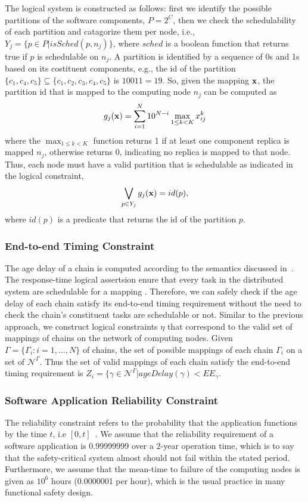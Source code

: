 The logical system is constructed as follows: first we identify the possible partitions of the software components, $P=2^C$, then we check the schedulability of each partition and catagorize them per node, i.e., $Y_j=\{p\in P| isSched(p,n_j)\}$, where $sched$ is a boolean function that returns true if $p$ is schedulable on $n_j$.  A partition is identified by a sequence of 0s and 1s based on its costituent components, e.g., the id of the partition $\{c_1,c_4,c_5\}\subseteq \{c_1,c_2,c_3,c_4,c_5\}$ is $10011=19$. So, given the mapping $\textbf{x}$, the partition id that is mapped to the computing node $n_j$ can be computed as
\begin{align}
	g_j(\textbf{x})=\sum_{i=1}^{N}{10^{N-i}\max_{1\leq k< K}x^{k}_{ij}}
\end{align}
where the $\max_{1\leq k< K}$ function returns 1 if at least one component replica is mapped $n_j$, otherwise returns 0, indicating no replica is mapped to that node. Thus, each node must have a valid partition that is schedulable as indicated in the logical constraint,
\begin{align}
\bigvee\limits_{p\in Y_j}g_j (\textbf{x})= id(p) ,
\end{align}
where $id(p)$ is a predicate that returns the id of the partition $p$.

\subsubsection{End-to-end Timing Constraint}
The age delay of a chain is computed according to the semantics discussed in~\cite{Feiertag2009ASemantics}\cite{mubeen2013support}. The response-time logical assertsion enure that every task in the distributed system are schedulable for a mapping \ttx. Therefore, we can safely check if the age delay of each chain satisfy its end-to-end timing requirement without the need to check the chain's constituent tasks are schedulable or not. Similar to the previous approach, we construct logical constraints $\eta$ that correspond to the valid set of mappings of chains on the network of computing nodes.  Given $\Gamma =\{\Gamma_i:i=1,...,N\}$ of chains, the set of possible mappings of each chain $\Gamma_i$ on a set of $\mathcal{N}^\Gamma$. Thus the set of valid mappings of each chain satisfy the end-to-end timing requirement is $Z_i=\{\gamma\in \mathcal{N}^\Gamma| ageDelay(\gamma) < EE_\gamma$.

\subsubsection{Software Application Reliability Constraint}
The reliability constraint refers to the probability that the application functions by the time $t$, i.e $[0,t]$~\cite{Goel1985SoftwareApplicability}. We assume that the reliability requirement of a software application is 0.99999999 over a 2-year operation time, which is to say  that the safety-critical system almost should not fail within the stated period. Furthermore, we assume that the mean-time to failure of the computing nodes is given as $10^6$ hours (0.0000001 per hour), which is the usual practice in many functional safety design.

